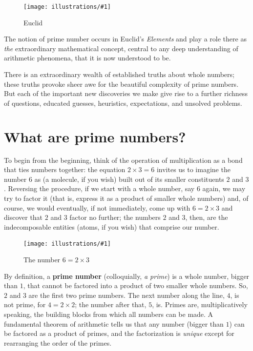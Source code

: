 \documentclass[openany]{book}
\newcommand{\ill}[3]{%
   \begin{figure}[H]%
   \vspace{-2ex}
   \centering%
   \texttt{[image: illustrations/\#1]}%
   \caption{#3}%
   \vspace{-2ex}
    \end{figure}}
\theoremstyle{plain}
\theoremstyle{definition}
\begin{document}
\ill{euclid}{.3}{Euclid}           

The notion of  prime number occurs in  Euclid's  {\it Elements}  and play a role there as
{\em the} extraordinary mathematical concept, central to any deep
understanding of arithmetic phenomena, that it is now understood to
be.
       



There is an extraordinary wealth of established truths about whole
numbers; these truths provoke sheer awe for the beautiful complexity
of prime numbers. But each of the important new discoveries we make
give rise to a further richness of questions, educated guesses,
heuristics, expectations, and unsolved problems.
            
            
            
\chapter{What are prime numbers?}\label{ch:what_are_primes}

 To begin from the beginning, think
of the operation of multiplication as a bond that ties numbers
together: the equation $2\times 3= 6$ invites us to imagine the number
$6$ as (a molecule, if you wish) built out of its smaller constituents
$2$ and $3$.  Reversing the procedure, if we start with a whole
number, say $6$ again, we may try to factor it (that is, express it as
a product of smaller whole numbers) and, of course, we would
eventually, if not immediately, come up with $6 = 2\times 3$ and
discover that $2$ and $3$ factor no further; the numbers $2$ and $3$,
then, are the indecomposable entities (atoms, if you wish) that
comprise our number.  

\ill{factor_tree_6}{.3}{The number $6 = 2\times 3$}
            

By definition, a {\bf prime number}
(colloquially, {\em a prime}) is a whole number, bigger than $1$, that
cannot be factored into a product of two smaller whole numbers. So,
$2$ and $3$ are the first two prime numbers. The next number along the
line, $4$, is not prime, for $4= 2\times 2$; the number after that,
$5$, is. Primes are, multiplicatively speaking, the building blocks
from which all numbers can be made. A fundamental theorem of
arithmetic tells us that any number (bigger than $1$) can be factored
as a product of primes, and the factorization is {\em unique} except
for rearranging the order of the primes. 
\end{document}
